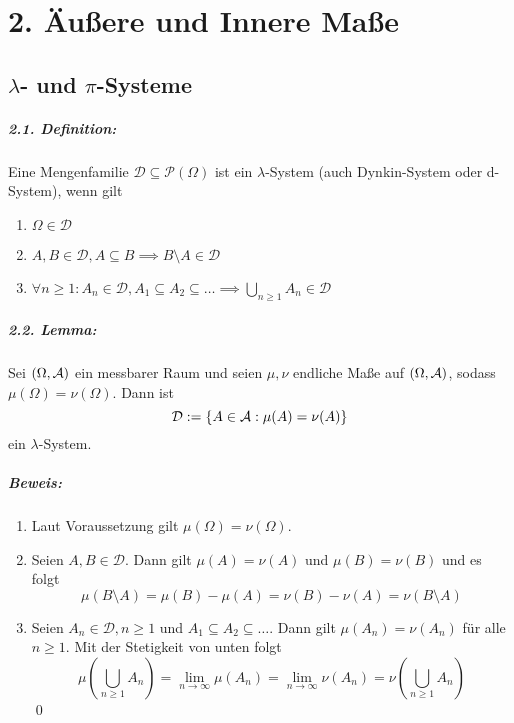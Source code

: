 \chapter*{2. \"Au\ss{}ere und Innere Ma\ss{}e}

\section*{$\lambda$- und $\pi$-Systeme}

\paragraph{2.1. Definition:}Eine Mengenfamilie $\mathcal{D}\subseteq\mathcal{P}(\Omega)$ ist ein $\lambda$-System (auch Dynkin-System oder d-System), wenn gilt
\begin{enumerate}[label=(\roman*)]
    \item $\Omega\in\mathcal{D}$
    \item $A,B\in\mathcal{D},A\subseteq B\implies B\setminus A\in\mathcal{D}$
    \item $\forall n\geq1:A_n\in\mathcal{D},A_1\subseteq A_2\subseteq\hdots\implies\displaystyle\bigcup_{n\geq1}A_n\in\mathcal{D}$
\end{enumerate}

\paragraph{2.2. Lemma:}Sei $(\Omega,\mathcal{A})$ ein messbarer Raum und seien $\mu,\nu$ endliche Ma\ss{}e auf $(\Omega,\mathcal{A})$, sodass $\mu(\Omega)=\nu(\Omega)$. Dann ist 
$$\mathcal{D}:=\{A\in\mathcal{A}:\mu(A)=\nu(A)\}$$
ein $\lambda$-System.

\paragraph{Beweis:}
\begin{enumerate}[label=(\roman*)]
    \item Laut Voraussetzung gilt $\mu(\Omega)=\nu(\Omega)$.
    \item Seien $A,B\in\mathcal{D}$. Dann gilt $\mu(A)=\nu(A)$ und $\mu(B)=\nu(B)$ und es folgt
    $$\mu(B\setminus A)=\mu(B)-\mu(A)=\nu(B)-\nu(A)=\nu(B\setminus A)$$
    \item Seien $A_n\in\mathcal{D},n\geq1$ und $A_1\subseteq A_2\subseteq\hdots$. Dann gilt $\mu(A_n)=\nu(A_n)$ f\"ur alle $n\geq1$. Mit der Stetigkeit von unten folgt 
    $$\mu\left(\bigcup_{n\geq1}A_n\right)=\lim_{n\to\infty}\mu(A_n)=\lim_{n\to\infty}\nu(A_n)=\nu\left(\bigcup_{n\geq1}A_n\right)$$
    \qed
\end{enumerate}

